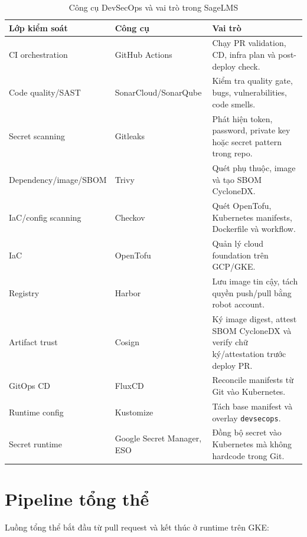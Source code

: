 \begin{table}[H]
\centering
\caption{Công cụ DevSecOps và vai trò trong SageLMS}
\label{tab:devsecops-tools}
\begin{tabularx}{\textwidth}{p{}p{}Y}
\toprule
\textbf{Lớp kiểm soát} & \textbf{Công cụ} & \textbf{Vai trò} \\
\midrule
CI orchestration & GitHub Actions & Chạy PR validation, CD, infra plan và post-deploy check. \\
Code quality/SAST & SonarCloud/\allowbreak SonarQube & Kiểm tra quality gate, bugs, vulnerabilities, code smells. \\
Secret scanning & Gitleaks & Phát hiện token, password, private key hoặc secret pattern trong repo. \\
Dependency/\allowbreak image/\allowbreak SBOM & Trivy & Quét phụ thuộc, image và tạo SBOM CycloneDX. \\
IaC/config scanning & Checkov & Quét OpenTofu, Kubernetes manifests, Dockerfile và workflow. \\
IaC & OpenTofu & Quản lý cloud foundation trên GCP/GKE. \\
Registry & Harbor & Lưu image tin cậy, tách quyền push/pull bằng robot account. \\
Artifact trust & Cosign & Ký image digest, attest SBOM CycloneDX và verify chữ ký/attestation trước deploy PR. \\
GitOps CD & FluxCD & Reconcile manifests từ Git vào Kubernetes. \\
Runtime config & Kustomize & Tách base manifest và overlay \texttt{devsecops}. \\
Secret runtime & Google Secret Manager, ESO & Đồng bộ secret vào Kubernetes mà không hardcode trong Git. \\
\bottomrule
\end{tabularx}
\end{table}

\section{Pipeline tổng thể}

Luồng tổng thể bắt đầu từ pull request và kết thúc ở runtime trên GKE:

